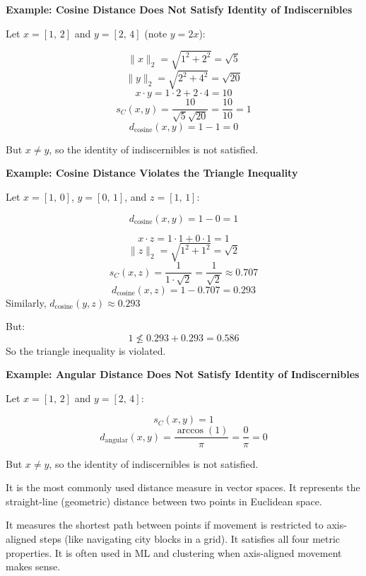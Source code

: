 \documentclass{article}
\begin{document}
\textbf{Example: Cosine Distance Does Not Satisfy Identity of Indiscernibles}

Let $x = [1,\,2]$ and $y = [2,\,4]$ (note $y = 2x$):

\[
\|x\|_2 = \sqrt{1^2 + 2^2} = \sqrt{5}
\]
\[
\|y\|_2 = \sqrt{2^2 + 4^2} = \sqrt{20}
\]
\[
x \cdot y = 1 \cdot 2 + 2 \cdot 4 = 10
\]
\[
s_C(x, y) = \frac{10}{\sqrt{5}\sqrt{20}} = \frac{10}{10} = 1
\]
\[
d_{\text{cosine}}(x, y) = 1 - 1 = 0
\]

But $x \neq y$, so the identity of indiscernibles is not satisfied.

\textbf{Example: Cosine Distance Violates the Triangle Inequality}

Let $x = [1,\,0]$, $y = [0,\,1]$, and $z = [1,\,1]$:

\[
d_{\text{cosine}}(x, y) = 1 - 0 = 1
\]

\[
x \cdot z = 1 \cdot 1 + 0 \cdot 1 = 1
\]
\[
\|z\|_2 = \sqrt{1^2 + 1^2} = \sqrt{2}
\]
\[
s_C(x, z) = \frac{1}{1 \cdot \sqrt{2}} = \frac{1}{\sqrt{2}} \approx 0.707
\]
\[
d_{\text{cosine}}(x, z) = 1 - 0.707 = 0.293
\]
Similarly, $d_{\text{cosine}}(y, z) \approx 0.293$

But:
\[
1 \nleq 0.293 + 0.293 = 0.586
\]
So the triangle inequality is violated.

\textbf{Example: Angular Distance Does Not Satisfy Identity of Indiscernibles}

Let $x = [1,\,2]$ and $y = [2,\,4]$:

\[
s_C(x, y) = 1
\]
\[
d_{\text{angular}}(x, y) = \frac{\arccos(1)}{\pi} = \frac{0}{\pi} = 0
\]

But $x \neq y$, so the identity of indiscernibles is not satisfied.


It is the most commonly used distance measure in vector spaces. It represents the straight-line (geometric) distance between two points in Euclidean space.


It measures the shortest path between points if movement is restricted to axis-aligned steps (like navigating city blocks in a grid). It satisfies all four metric properties. It is often used in ML and clustering when axis-aligned movement makes sense.
\end{document}
